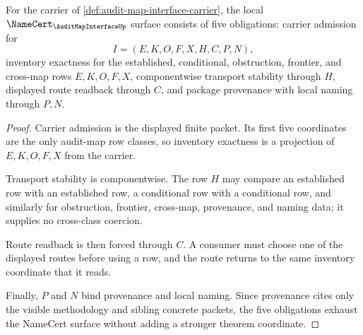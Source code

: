 \begin{theorem}
\label{thm:audit-map-interface-namecert-obligations}
For the carrier of \autoref{def:audit-map-interface-carrier}, the local $\NameCert_{\AuditMapInterfaceUp}$ surface consists of five obligations: carrier admission for
$$
I=(E,K,O,F,X,H,C,P,N),
$$
inventory exactness for the established, conditional, obstruction, frontier, and cross-map rows $E,K,O,F,X$, componentwise transport stability through $H$, displayed route readback through $C$, and package provenance with local naming through $P,N$.
\end{theorem}
\begin{proof}
Carrier admission is the displayed finite packet. Its first five coordinates are the only audit-map row classes, so inventory exactness is a projection of $E,K,O,F,X$ from the carrier.

Transport stability is componentwise. The row $H$ may compare an established row with an established row, a conditional row with a conditional row, and similarly for obstruction, frontier, cross-map, provenance, and naming data; it supplies no cross-class coercion.

Route readback is then forced through $C$. A consumer must choose one of the displayed routes before using a row, and the route returns to the same inventory coordinate that it reads.

Finally, $P$ and $N$ bind provenance and local naming. Since provenance cites only the visible methodology and sibling concrete packets, the five obligations exhaust the NameCert surface without adding a stronger theorem coordinate.
\end{proof}

